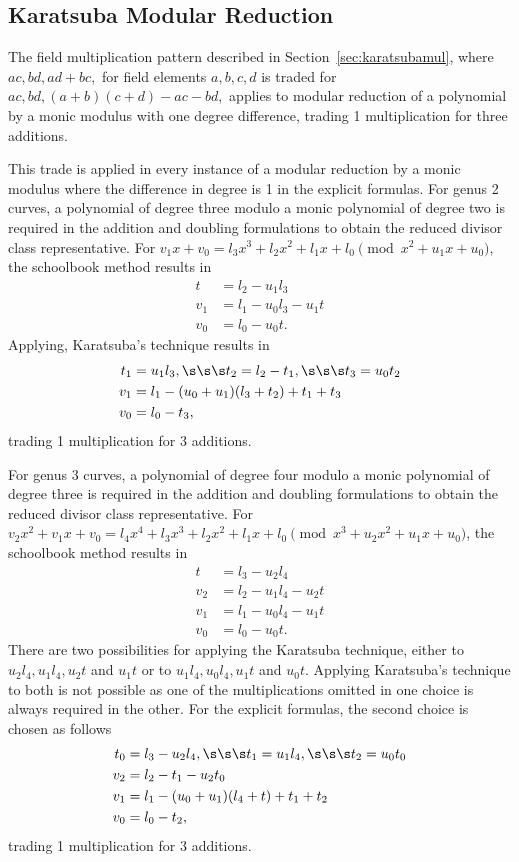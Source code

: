 \subsection{Karatsuba Modular Reduction} 
\label{sec:karatsubared}
The field multiplication pattern described in Section~\ref{sec:karatsubamul},
where $ac, bd, ad + bc,$ for field elements $a,b,c,d$  is traded for $ ac, bd,
(a + b)(c + d) - ac - bd,$ applies to modular reduction of a polynomial by a
monic modulus with one degree difference, trading 1 multiplication for three
additions.

This trade is applied in every instance of a modular reduction by a monic
modulus where the difference in degree is 1 in the explicit formulas. For genus
2 curves, a polynomial of degree three modulo a monic polynomial of degree two
is required in the addition and doubling formulations to obtain the reduced
divisor class representative. For $v_1x + v_0 = l_3x^3 + l_2x^2 + l_1x + l_0
\pmod{x^2 + u_1x + u_0}$, the schoolbook method results in 
\begin{align*}
t &= l_2 - u_1l_3\\
v_1 &= l_1 - u_0l_3 - u_1t\\
v_0 &= l_0 - u_0t.
\end{align*}
Applying, Karatsuba's technique results in
\begin{align*}
t_1 &= u_1l_3, \s\s\s t_2 = l_2 - t_1, \s\s\s t_3 = u_0t_2\\
v_1 &= l_1 - (u_0 + u_1)(l_3 + t_2) + t_1 + t_3\\
v_0 &= l_0 - t_3,
\end{align*}
trading 1 multiplication for 3 additions.


For genus 3 curves, a polynomial of degree four modulo a monic polynomial of
degree three is required in the addition and doubling formulations to obtain the
reduced divisor class representative. For $v_2x^2 + v_1x + v_0 = l_4x^4 + l_3x^3
+ l_2x^2 + l_1x + l_0 \pmod{x^3 + u_2x^2 + u_1x + u_0}$, the schoolbook method results in 
\begin{align*}
t &= l_3 - u_2l_4\\
v_2 &= l_2 - u_1l_4 - u_2t\\
v_1 &= l_1 - u_0l_4 - u_1t\\
v_0 &= l_0 - u_0t.
\end{align*}
There are two possibilities for applying the Karatsuba technique, either to
$u_2l_4, u_1l_4, u_2t$ and $u_1t$ or to $u_1l_4, u_0l_4, u_1t$ and $u_0t$.
Applying Karatsuba's technique to both is not possible as one of the
multiplications omitted in one choice is always required in the other. For the
explicit formulas, the second choice is chosen as follows
\begin{align*}
t_0 &= l_3 - u_2l_4, \s\s\s t_1 = u_1l_4, \s\s\s t_2 = u_0t_0\\
v_2 &= l_2 - t_1 - u_2t_0\\
v_1 &= l_1 - (u_0 + u_1)(l_4 + t) + t_1 + t_2\\
v_0 &= l_0 - t_2,
\end{align*}
trading 1 multiplication for 3 additions.


